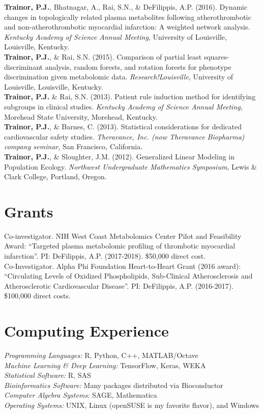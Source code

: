 {\textbf{Trainor, P.J.}, Bhatnagar, A., Rai, S.N., \& DeFilippis, A.P. (2016). Dynamic changes in topologically related plasma metabolites following atherothrombotic and non-atherothrombotic myocardial infarction: A weighted network analysis. \emph{Kentucky Academy of Science Annual Meeting}, University of Louisville, Louisville, Kentucky.  \\ 

\textbf{Trainor, P.J.}, \& Rai, S.N. (2015). Comparison of partial least squares-discriminant analysis, random forests, and rotation forests for phenotype discrimination given metabolomic data. \emph{Research!Louisville}, University of Louisville, Louisville, Kentucky.  \\ 

\textbf{Trainor, P.J.} \& Rai, S.N. (2013). Patient rule induction method for identifying subgroups in clinical studies. \emph{Kentucky Academy of Science Annual Meeting}, Morehead State University, Morehead, Kentucky. \\ 

\textbf{Trainor, P.J.}, \& Barnes, C. (2013). Statistical considerations for dedicated cardiovascular safety studies. \emph{Theravance, Inc. (now Theravance Biopharma) company seminar}, San Francisco, California. \\ 

\textbf{Trainor, P.J.}, \& Sloughter, J.M. (2012). Generalized Linear Modeling in Population Ecology. \emph{Northwest Undergraduate Mathematics Symposium}, Lewis \& Clark College, Portland, Oregon. 

\section*{Grants}
 Co-investigator. NIH West Coast Metabolomics Center Pilot and Feasibility Award: ``Targeted plasma metabolomic profiling of thrombotic myocardial infarction''. PI: DeFilippis, A.P. (2017-2018). \$50,000 direct cost. \\

 Co-Investigator. Alpha Phi Foundation Heart-to-Heart Grant (2016 award): ``Circulating Levels of Oxidized Phospholipids, Sub-Clinical Atherosclerosis and Atherosclerotic Cardiovascular Disease''. PI: DeFilippis, A.P. (2016-2017). \$100,000 direct costs. 

\section*{Computing Experience} 
\emph{Programming Languages:} R, Python, C++, MATLAB/Octave \\
\emph{Machine Learning \& Deep Learning:} TensorFlow, Keras, WEKA \\
\emph{Statistical Software:} R, SAS \\
\emph{Bioinformatics Software:} Many packages distributed via Bioconductor \\
\emph{Computer Algebra Systems:} SAGE, Mathematica \\ 
\emph{Operating Systems:} UNIX, Linux (openSUSE is my favorite flavor), and Windows

}
